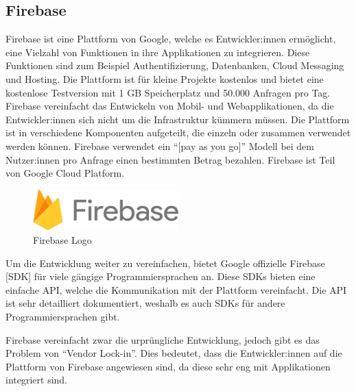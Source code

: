 ﻿\subsection{Firebase}
\label{sec:firebase}

Firebase ist eine Plattform von Google, welche es Entwickler:innen ermöglicht, eine Vielzahl von Funktionen in ihre Applikationen zu integrieren. Diese Funktionen sind zum Beispiel Authentifizierung, Datenbanken, Cloud Messaging und Hosting. Die Plattform ist für kleine Projekte kostenlos und bietet eine kostenlose Testversion mit 1 GB Speicherplatz und 50.000 Anfragen pro Tag. Firebase vereinfacht das Entwickeln von Mobil- und Webapplikationen, da die Entwickler:innen sich nicht um die Infrastruktur kümmern müssen. Die Plattform ist in verschiedene Komponenten aufgeteilt, die einzeln oder zusammen verwendet werden können. Firebase verwendet ein \enquote{[pay as you go]} Modell bei dem Nutzer:innen pro Anfrage einen bestimmten Betrag bezahlen. Firebase ist Teil von Google Cloud Platform.

\begin{figure}[h]
  \centering
  \includegraphics[width=0.5\textwidth]{images/firebase_logo}
  \caption{Firebase Logo }
  \label{fig:firebase_logo}
\end{figure}

Um die Entwicklung weiter zu vereinfachen, bietet Google offizielle Firebase [\acs{SDK}] für viele gängige Programmiersprachen an. Diese SDKs bieten eine einfache \ac{API}, welche die Kommunikation mit der Plattform vereinfacht. Die \ac{API} ist sehr detailliert dokumentiert, weshalb es auch SDKs für andere Programmiersprachen gibt.

Firebase vereinfacht zwar die urprüngliche Entwicklung, jedoch gibt es das Problem von \enquote{Vendor Lock-in}. Dies bedeutet, dass die Entwickler:innen auf die Plattform von Firebase angewiesen sind, da diese sehr eng mit Applikationen integriert sind.
